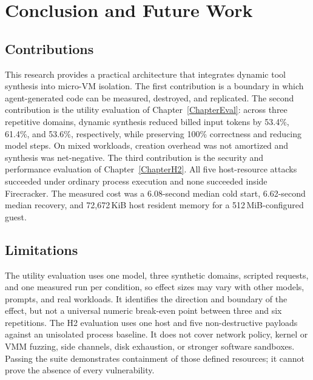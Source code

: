 
\chapter{Conclusion and Future Work}
\label{Chapter6}

\section{Contributions}
This research provides a practical architecture that integrates dynamic tool synthesis into micro-VM isolation. The first contribution is a boundary in which agent-generated code can be measured, destroyed, and replicated. The second contribution is the utility evaluation of Chapter~\ref{ChapterEval}: across three repetitive domains, dynamic synthesis reduced billed input tokens by 53.4\%, 61.4\%, and 53.6\%, respectively, while preserving 100\% correctness and reducing model steps. On mixed workloads, creation overhead was not amortized and synthesis was net-negative. The third contribution is the security and performance evaluation of Chapter~\ref{ChapterH2}. All five host-resource attacks succeeded under ordinary process execution and none succeeded inside Firecracker. The measured cost was a 6.08-second median cold start, 6.62-second median recovery, and 72{,}672\,KiB host resident memory for a 512\,MiB-configured guest.

\section{Limitations}
The utility evaluation uses one model, three synthetic domains, scripted requests, and one measured run per condition, so effect sizes may vary with other models, prompts, and real workloads. It identifies the direction and boundary of the effect, but not a universal numeric break-even point between three and six repetitions. The H2 evaluation uses one host and five non-destructive payloads against an unisolated process baseline. It does not cover network policy, kernel or VMM fuzzing, side channels, disk exhaustion, or stronger software sandboxes. Passing the suite demonstrates containment of those defined resources; it cannot prove the absence of every vulnerability.

